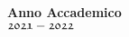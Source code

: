 \begin{titlepage}
\vfill

% 
\begin{center}
{\normalsize{\bf Anno Accademico\\
$\mathfrak{2021-2022}$ }}
\end{center} %
\end{titlepage}
\restoregeometry 